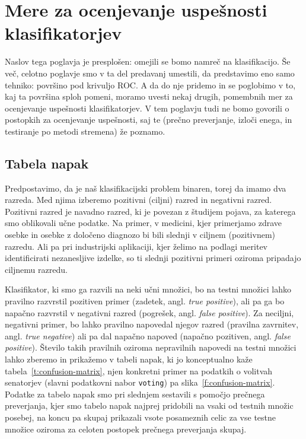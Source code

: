 \chapter{Mere za ocenjevanje uspešnosti klasifikatorjev}

Naslov tega poglavja je presplošen: omejili se bomo namreč na klasifikacijo. Še več, celotno poglavje smo v ta del predavanj umestili, da predstavimo eno samo tehniko: površino pod krivuljo ROC. A da do nje pridemo in se poglobimo v to, kaj ta površina sploh pomeni, moramo uvesti nekaj drugih, pomembnih mer za ocenjevanje uspešnosti klasifikatorjev. V tem poglavju tudi ne bomo govorili o postopkih za ocenjevanje uspešnosti, saj te (prečno preverjanje, izloči enega, in testiranje po metodi stremena) že poznamo.

\section{Tabela napak}

Predpostavimo, da je naš klasifikacijski problem binaren, torej da imamo dva razreda. Med njima izberemo pozitivni (ciljni) razred in negativni razred. Pozitivni razred je navadno razred, ki je povezan z študijem pojava, za katerega smo oblikovali učne podatke. Na primer, v medicini, kjer primerjamo zdrave osebke in osebke z določeno diagnozo bi bili slednji v ciljnem (pozitivnem) razredu. Ali pa pri industrijski aplikaciji, kjer želimo na podlagi meritev identificirati nezanesljive izdelke, so ti slednji pozitivni primeri oziroma pripadajo ciljnemu razredu.

Klasifikator, ki smo ga razvili na neki učni množici, bo na testni množici lahko pravilno razvrstil pozitiven primer (zadetek, angl. {\em true positive}), ali pa ga bo napačno razvrstil v negativni razred (pogrešek, angl. {\em false positive}). Za neciljni, negativni primer, bo lahko pravilno napovedal njegov razred (pravilna zavrnitev, angl. {\em true negative}) ali pa dal napačno napoved (napačno pozitiven, angl. {\em false positive}). Število takih pravilnih oziroma nepravilnih napovedi na testni množici lahko zberemo in prikažemo v tabeli napak, ki jo konceptualno kaže tabela~\ref{t:confusion-matrix}, njen konkretni primer na podatkih o volitvah senatorjev (slavni podatkovni nabor {\tt voting}) pa slika~\ref{f:confusion-matrix}. Podatke za tabelo napak smo pri slednjem sestavili s pomočjo prečnega preverjanja, kjer smo tabelo napak najprej pridobili na vsaki od testnih množic posebej, na koncu pa skupaj prikazali vsote posameznih celic za vse testne množice oziroma za celoten postopek prečnega preverjanja skupaj.

